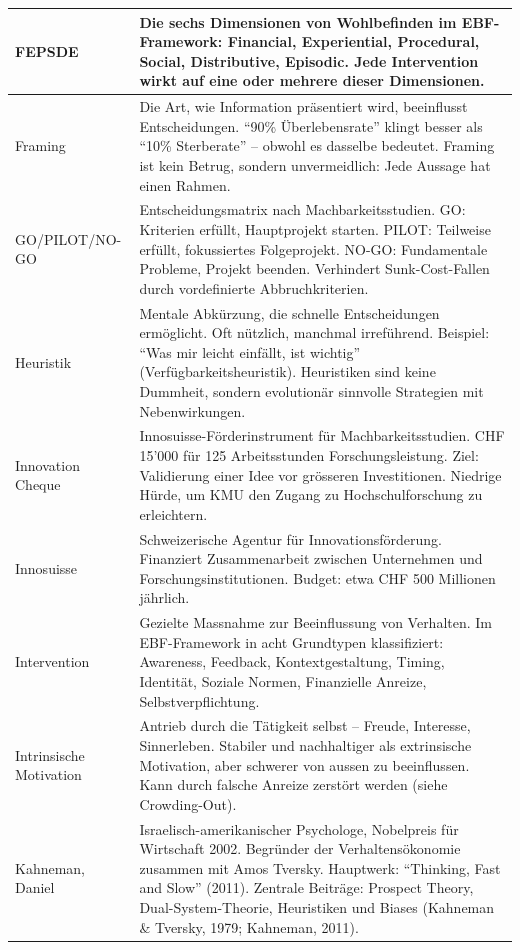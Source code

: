 \documentclass[11pt,a4paper]{article}
\begin{document}
\begin{longtable}{@{}L{4cm}L{10cm}@{}}
\midrule
FEPSDE & Die sechs Dimensionen von Wohlbefinden im EBF-Framework: Financial, Experiential, Procedural, Social, Distributive, Episodic. Jede Intervention wirkt auf eine oder mehrere dieser Dimensionen. \\
\midrule
Framing & Die Art, wie Information präsentiert wird, beeinflusst Entscheidungen. ``90\% Überlebensrate'' klingt besser als ``10\% Sterberate'' -- obwohl es dasselbe bedeutet. Framing ist kein Betrug, sondern unvermeidlich: Jede Aussage hat einen Rahmen. \\
\midrule
GO/PILOT/NO-GO & Entscheidungsmatrix nach Machbarkeitsstudien. GO: Kriterien erfüllt, Hauptprojekt starten. PILOT: Teilweise erfüllt, fokussiertes Folgeprojekt. NO-GO: Fundamentale Probleme, Projekt beenden. Verhindert Sunk-Cost-Fallen durch vordefinierte Abbruchkriterien. \\
\midrule
Heuristik & Mentale Abkürzung, die schnelle Entscheidungen ermöglicht. Oft nützlich, manchmal irreführend. Beispiel: ``Was mir leicht einfällt, ist wichtig'' (Verfügbarkeitsheuristik). Heuristiken sind keine Dummheit, sondern evolutionär sinnvolle Strategien mit Nebenwirkungen. \\
\midrule
Innovation Cheque & Innosuisse-Förderinstrument für Machbarkeitsstudien. CHF 15'000 für 125 Arbeitsstunden Forschungsleistung. Ziel: Validierung einer Idee vor grösseren Investitionen. Niedrige Hürde, um KMU den Zugang zu Hochschulforschung zu erleichtern. \\
\midrule
Innosuisse & Schweizerische Agentur für Innovationsförderung. Finanziert Zusammenarbeit zwischen Unternehmen und Forschungsinstitutionen. Budget: etwa CHF 500 Millionen jährlich. \\
\midrule
Intervention & Gezielte Massnahme zur Beeinflussung von Verhalten. Im EBF-Framework in acht Grundtypen klassifiziert: Awareness, Feedback, Kontextgestaltung, Timing, Identität, Soziale Normen, Finanzielle Anreize, Selbstverpflichtung. \\
\midrule
Intrinsische Motivation & Antrieb durch die Tätigkeit selbst -- Freude, Interesse, Sinnerleben. Stabiler und nachhaltiger als extrinsische Motivation, aber schwerer von aussen zu beeinflussen. Kann durch falsche Anreize zerstört werden (siehe Crowding-Out). \\
\midrule
Kahneman, Daniel & Israelisch-amerikanischer Psychologe, Nobelpreis für Wirtschaft 2002. Begründer der Verhaltensökonomie zusammen mit Amos Tversky. Hauptwerk: ``Thinking, Fast and Slow'' (2011). Zentrale Beiträge: Prospect Theory, Dual-System-Theorie, Heuristiken und Biases (Kahneman \& Tversky, 1979; Kahneman, 2011). \\

\end{longtable}
\end{document}
